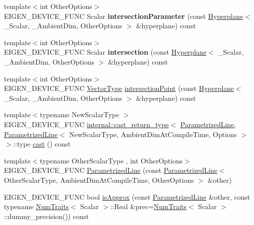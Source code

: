 \begin{DoxyCompactItemize}
{\footnotesize template$<$int Other\+Options$>$ }\\E\+I\+G\+E\+N\+\_\+\+D\+E\+V\+I\+C\+E\+\_\+\+F\+U\+NC Scalar {\bfseries intersection\+Parameter} (const \mbox{\hyperlink{class_eigen_1_1_hyperplane}{Hyperplane}}$<$ \+\_\+\+Scalar, \+\_\+\+Ambient\+Dim, Other\+Options $>$ \&hyperplane) const
\item 
\mbox{\label{class_eigen_1_1_parametrized_line_ad88a4efe64b19c643feb03c7e21bb28b}} 
{\footnotesize template$<$int Other\+Options$>$ }\\E\+I\+G\+E\+N\+\_\+\+D\+E\+V\+I\+C\+E\+\_\+\+F\+U\+NC Scalar {\bfseries intersection} (const \mbox{\hyperlink{class_eigen_1_1_hyperplane}{Hyperplane}}$<$ \+\_\+\+Scalar, \+\_\+\+Ambient\+Dim, Other\+Options $>$ \&hyperplane) const
\item 
{\footnotesize template$<$int Other\+Options$>$ }\\E\+I\+G\+E\+N\+\_\+\+D\+E\+V\+I\+C\+E\+\_\+\+F\+U\+NC \mbox{\hyperlink{class_eigen_1_1_matrix}{Vector\+Type}} \mbox{\hyperlink{class_eigen_1_1_parametrized_line_a9319102677fc48d2208c949f448f4829}{intersection\+Point}} (const \mbox{\hyperlink{class_eigen_1_1_hyperplane}{Hyperplane}}$<$ \+\_\+\+Scalar, \+\_\+\+Ambient\+Dim, Other\+Options $>$ \&hyperplane) const
\item 
{\footnotesize template$<$typename New\+Scalar\+Type $>$ }\\E\+I\+G\+E\+N\+\_\+\+D\+E\+V\+I\+C\+E\+\_\+\+F\+U\+NC \mbox{\hyperlink{struct_eigen_1_1internal_1_1cast__return__type}{internal\+::cast\+\_\+return\+\_\+type}}$<$ \mbox{\hyperlink{class_eigen_1_1_parametrized_line}{Parametrized\+Line}}, \mbox{\hyperlink{class_eigen_1_1_parametrized_line}{Parametrized\+Line}}$<$ New\+Scalar\+Type, Ambient\+Dim\+At\+Compile\+Time, Options $>$ $>$\+::type \mbox{\hyperlink{class_eigen_1_1_parametrized_line_a2f48ba47cd487a3550b4371f01c3271c}{cast}} () const
\item 
{\footnotesize template$<$typename Other\+Scalar\+Type , int Other\+Options$>$ }\\E\+I\+G\+E\+N\+\_\+\+D\+E\+V\+I\+C\+E\+\_\+\+F\+U\+NC \mbox{\hyperlink{class_eigen_1_1_parametrized_line_a69aed1a96062648d4e61dce3b5fb896f}{Parametrized\+Line}} (const \mbox{\hyperlink{class_eigen_1_1_parametrized_line}{Parametrized\+Line}}$<$ Other\+Scalar\+Type, Ambient\+Dim\+At\+Compile\+Time, Other\+Options $>$ \&other)
\item 
E\+I\+G\+E\+N\+\_\+\+D\+E\+V\+I\+C\+E\+\_\+\+F\+U\+NC bool \mbox{\hyperlink{class_eigen_1_1_parametrized_line_a27a86c54f66a622847470f79aec4ea2f}{is\+Approx}} (const \mbox{\hyperlink{class_eigen_1_1_parametrized_line}{Parametrized\+Line}} \&other, const typename \mbox{\hyperlink{struct_eigen_1_1_num_traits}{Num\+Traits}}$<$ Scalar $>$\+::Real \&prec=\mbox{\hyperlink{struct_eigen_1_1_num_traits}{Num\+Traits}}$<$ Scalar $>$\+::dummy\+\_\+precision()) const

\end{DoxyCompactItemize}

